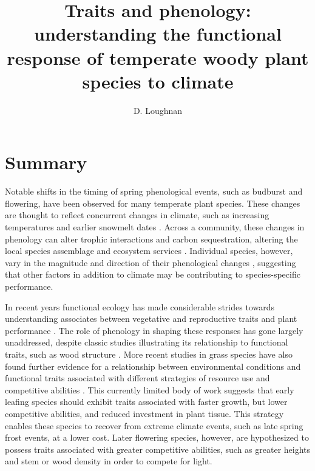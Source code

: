 \documentclass[11pt,a4paper,oneside]{article}
\title{Traits and phenology: understanding the functional response of temperate woody plant species to climate} %
\author{D. Loughnan}
\begin{document}
% 

\maketitle
 
\section*{Summary}
\par Notable shifts in the timing of spring phenological events, such as budburst and flowering, have been observed for many temperate plant species. These changes are thought to reflect concurrent changes in climate, such as increasing temperatures and earlier snowmelt dates \cite{ Anderson2012}. Across a community, these changes in phenology can alter trophic interactions and carbon sequestration, altering the local species assemblage and ecosystem services \cite{Kharouba2018, Cleland:2007}. Individual species, however, vary in the magnitude and direction of their phenological changes \cite{Fitter2002,Dunnell2011, Konig2018}, suggesting that other factors in addition to climate may be contributing to species-specific performance.

\par In recent years functional ecology has made considerable strides towards understanding associates between vegetative and reproductive traits and plant performance \cite{McGill2006}.  The role of phenology in shaping these responses has gone largely unaddressed, despite classic studies illustrating its relationship to functional traits, such as wood structure \cite{Lechowich1984}. More recent studies in grass species have also found further evidence for a relationship between environmental conditions and functional traits associated with different strategies of resource use and competitive abilities \cite{Konig2018; Sun2011}. This currently limited body of work suggests that early leafing species should exhibit traits associated with faster growth, but lower competitive abilities, and reduced investment in plant tissue. This strategy enables these species to recover from extreme climate events, such as late spring frost events, at a lower cost. Later flowering species, however, are hypothesized to possess traits associated with greater competitive abilities, such as greater heights and stem or wood density in order to compete for light. 
\end{document}
